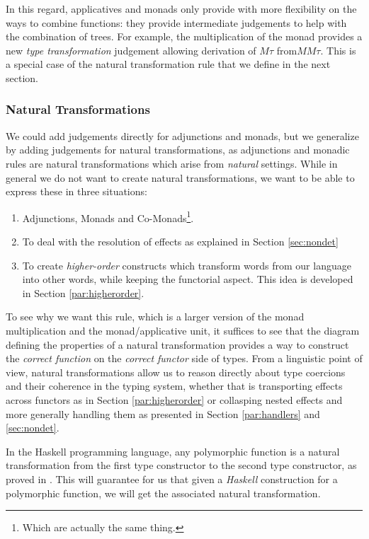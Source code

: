 \smallskip

In this regard, applicatives and monads only provide with more flexibility on
the ways to combine functions:
they provide intermediate judgements to help with the combination of trees.
For example, the multiplication of the monad provides a new \emph{type
	transformation} judgement allowing derivation of $M\tau$ from$MM\tau$.
This is a special case of the natural transformation rule that we
define in the next section.

\subsubsection{Natural Transformations}
\label{subsubsec:transnat}
We could add judgements directly for adjunctions and monads, but we generalize
by adding judgements for natural transformations, as adjunctions and monadic
rules are natural transformations which arise from \emph{natural} settings.
While in general we do not want to create natural transformations, we want to be
able to express these in three situations:
\begin{enumerate}
	\item Adjunctions, Monads and Co-Monads\footnote{Which are actually the same
		      thing.}.
	\item To deal with the resolution of effects as explained in Section
	      \ref{sec:nondet}
	\item To create \emph{higher-order} constructs which transform words from our
	      language into other words, while keeping the functorial aspect.
	      This idea is developed in Section \ref{par:higherorder}.
\end{enumerate}
To see why we want this rule, which is a larger version of the monad
multiplication and the monad/applicative unit, it suffices to see that the
diagram defining the properties of a natural transformation provides a way
to construct the \emph{correct function} on the \emph{correct functor} side of
types.
From a linguistic point of view, natural transformations allow us to reason
directly about type coercions and their coherence in the typing system,
whether that is transporting effects across functors as in Section
\ref{par:higherorder} or collasping nested effects and more generally handling
them as presented in Section \ref{par:handlers} and \ref{sec:nondet}.

\smallskip

In the Haskell programming language, any polymorphic function is
a natural transformation from the first type constructor to the second type
constructor, as proved in \cite{wadlerTheoremsFree1989}.
This will guarantee for us that given a \emph{Haskell} construction for a
polymorphic function, we will get the associated natural transformation.

